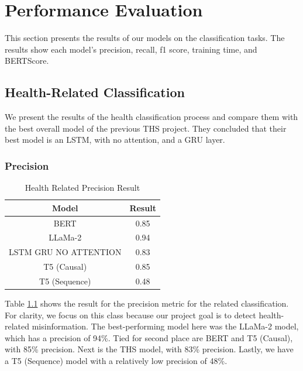 


\chapter{Performance Evaluation}  
This section presents the results of our models on the classification tasks. The results show each model's precision, recall, f1 score, training time, and BERTScore.


\section{Health-Related Classification}
We present the results of the health classification process and compare them with the best overall model of the previous THS project. They concluded
that their best model is an LSTM, with no attention, and a GRU layer.

\subsection{Precision}
\begin{table}[H]
	\centering
	\caption{Health Related Precision Result}
	\begin{tabular}{||c | c||} 
		\hline
		\textbf{Model} & \textbf{Result} \\ [0.5ex] 
		\hline
		BERT & 0.85  \\
		\hline
		LLaMa-2 & 0.94 \\ 
		\hline
		LSTM GRU NO ATTENTION & 0.83  \\
		\hline
		T5 (Causal) & 0.85 \\
		\hline
		T5 (Sequence) & 0.48 \\
		\hline
	\end{tabular}
	\label{table:HealthPrecision}
\end{table}

Table \ref{table:HealthPrecision} shows the result for the precision metric for the related classification. For clarity, we focus on this class because our project
goal is to detect health-related misinformation. The best-performing model here was the LLaMa-2 model, which has a precision of 94\%. Tied for second place
are BERT and T5 (Causal), with 85\% precision. Next is the THS model, with 83\% precision. Lastly, we have a T5 (Sequence) model with a relatively low
precision of 48\%.

